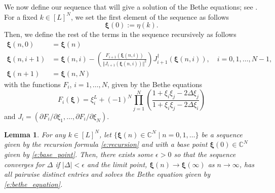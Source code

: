 \documentclass[a4paper,11pt]{article}
\newtheorem{lemma}[theorem]{Lemma}
\theoremstyle{definition}
\begin{document}
We now define our sequence that will give a solution of the Bethe equations; see . For a fixed $k \in [L]^N$, we set the first element of the sequence as follows
\begin{equation}\label{e:base_point}
    \boldsymbol{\xi}(0) := \eta(k).
\end{equation}
Then, we define the rest of the terms in the sequence recursively as follows
\begin{equation}\label{e:recursion}
\begin{split}
    \boldsymbol{\xi}(n, 0) &= \boldsymbol{\xi}(n) \\
    \boldsymbol{\xi}(n, i+1) &= \boldsymbol{\xi}(n, i) - \left(\frac{F_{i+1}(\boldsymbol{\xi}(n,i))}{\Vert J_{i+1}(\boldsymbol{\xi}(n, i)) \Vert^2 }\right) J^{\dagger}_{i+1}(\boldsymbol{\xi}(n, i)), \quad i=0, 1, \dots, N-1,\\
    \boldsymbol{\xi}(n+1) &= \boldsymbol{\xi}(n, N)
\end{split}
\end{equation}
with the functions $F_i$, $i = 1, \dots, N$, given by the Bethe equations
\begin{equation}
    F_i(\boldsymbol{\xi}) = \xi_i^{L} + (-1)^N\prod_{j=1}^N\left(\frac{1 + \xi_i \xi_j - 2 \Delta \xi_j}{1 + \xi_i \xi_j - 2 \Delta \xi_i} \right)
\end{equation}
and $J_i = (\partial F_i / \partial\xi_1, \dots, \partial F_i / \partial\xi_N)$. 

\begin{lemma}\label{l:BE_limit}
For any $k \in [L]^N$, let $\{\boldsymbol{\xi}(n)\in \mathbb{C}^N \mid  n=0, 1, \dots\}$ be a sequence given by the recursion formula \eqref{e:recursion} and with a base point $\boldsymbol{\xi}(0) \in \mathbb{C}^N$ given by \eqref{e:base_point}. Then, there exists some $\epsilon >0$ so that the sequence converges for $\Delta$ if $|\Delta| < \epsilon$ and the limit point, $\boldsymbol{\xi}(n) \rightarrow \boldsymbol{\xi}(\infty)$ as $n \rightarrow \infty$, has all pairwise distinct entries and solves the Bethe equation given by \eqref{e:bethe_equation}.
\end{lemma}
\end{document}
